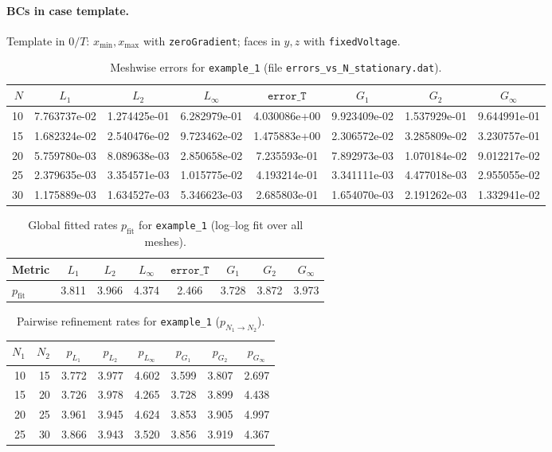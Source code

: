 \documentclass[11pt,a4paper]{article}
\begin{document}
\paragraph{BCs in case template.}
Template in $0/T$: $x_{\min},x_{\max}$ with \texttt{zeroGradient}; faces in $y,z$ with \texttt{fixedVoltage}.
\begin{table}[htbp]
\centering
\caption{Meshwise errors for \texttt{example\_1} (file \texttt{errors\_vs\_N\_stationary.dat}).}
\label{tab:errors-example-1}
\scriptsize
\begin{tabular}{rccccccc}
\toprule
$N$ & $L_1$ & $L_2$ & $L_\infty$ & $\texttt{error\_T}$ & $G_1$ & $G_2$ & $G_\infty$ \\
\midrule
10 & 7.763737e-02 & 1.274425e-01 & 6.282979e-01 & 4.030086e+00 & 9.923409e-02 & 1.537929e-01 & 9.644991e-01 \\
15 & 1.682324e-02 & 2.540476e-02 & 9.723462e-02 & 1.475883e+00 & 2.306572e-02 & 3.285809e-02 & 3.230757e-01 \\
20 & 5.759780e-03 & 8.089638e-03 & 2.850658e-02 & 7.235593e-01 & 7.892973e-03 & 1.070184e-02 & 9.012217e-02 \\
25 & 2.379635e-03 & 3.354571e-03 & 1.015775e-02 & 4.193214e-01 & 3.341111e-03 & 4.477018e-03 & 2.955055e-02 \\
30 & 1.175889e-03 & 1.634527e-03 & 5.346623e-03 & 2.685803e-01 & 1.654070e-03 & 2.191262e-03 & 1.332941e-02 \\
\bottomrule
\end{tabular}
\end{table}
\begin{table}[htbp]
\centering
\caption{Global fitted rates $p_{\mathrm{fit}}$ for \texttt{example\_1} (log--log fit over all meshes).}
\label{tab:fit-example-1}
\small
\begin{tabular}{lccccccc}
\toprule
Metric & $L_1$ & $L_2$ & $L_\infty$ & $\texttt{error\_T}$ & $G_1$ & $G_2$ & $G_\infty$ \\
\midrule
$p_{\mathrm{fit}}$ & 3.811 & 3.966 & 4.374 & 2.466 & 3.728 & 3.872 & 3.973 \\
\bottomrule
\end{tabular}
\end{table}
\begin{table}[htbp]
\centering
\caption{Pairwise refinement rates for \texttt{example\_1} ($p_{N_1\to N_2}$).}
\label{tab:pair-example-1}
\scriptsize
\begin{tabular}{rrcccccc}
\toprule
$N_1$ & $N_2$ & $p_{L_1}$ & $p_{L_2}$ & $p_{L_\infty}$ & $p_{G_1}$ & $p_{G_2}$ & $p_{G_\infty}$ \\
\midrule
10 & 15 & 3.772 & 3.977 & 4.602 & 3.599 & 3.807 & 2.697 \\
15 & 20 & 3.726 & 3.978 & 4.265 & 3.728 & 3.899 & 4.438 \\
20 & 25 & 3.961 & 3.945 & 4.624 & 3.853 & 3.905 & 4.997 \\
25 & 30 & 3.866 & 3.943 & 3.520 & 3.856 & 3.919 & 4.367 \\
\bottomrule
\end{tabular}
\end{table}
\end{document}
